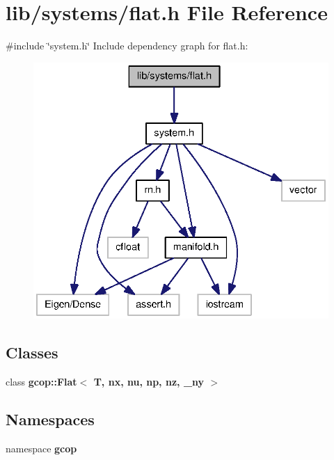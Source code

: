 \section{lib/systems/flat.h \-File \-Reference}
\label{flat_8h}
{\ttfamily \#include \char`\"{}system.\-h\char`\"{}}\*
\-Include dependency graph for flat.\-h\-:\nopagebreak
\begin{figure}[H]
\begin{center}
\leavevmode
\includegraphics[width=336pt]{flat_8h__incl}
\end{center}
\end{figure}
\subsection*{\-Classes}
\begin{DoxyCompactItemize}
\item 
class {\bf gcop\-::\-Flat$<$ T, nx, nu, np, nz, \-\_\-ny $>$}
\end{DoxyCompactItemize}
\subsection*{\-Namespaces}
\begin{DoxyCompactItemize}
\item 
namespace {\bf gcop}
\end{DoxyCompactItemize}
